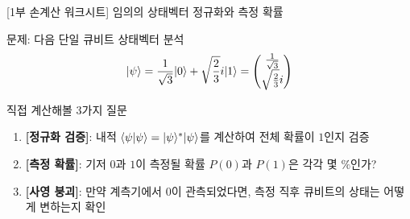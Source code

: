 \documentclass[aspectratio=169, 10pt]{beamer}
\begin{document}
\begin{frame}{[1부 손계산 워크시트] 임의의 상태벡터 정규화와 측정 확률}
    \begin{block}{문제: 다음 단일 큐비트 상태벡터 분석}
        $$|\psi\rangle = \frac{1}{\sqrt{3}}|0\rangle + \sqrt{\frac{2}{3}}i|1\rangle = \begin{pmatrix} \frac{1}{\sqrt{3}} \\ \sqrt{\frac{2}{3}}i \end{pmatrix}$$
    \end{block}\pause
    \vspace{0.2cm}
    \begin{exampleblock}{직접 계산해볼 3가지 질문}
        \begin{enumerate}
            \item \textbf{[정규화 검증]}: 내적 $\langle\psi|\psi\rangle = |\psi\rangle^* |\psi\rangle$를 계산하여 전체 확률이 $1$인지 검증
            \item \textbf{[측정 확률]}: 기저 $0$과 $1$이 측정될 확률 $P(0)$과 $P(1)$은 각각 몇 $\%$인가?
            \item \textbf{[사영 붕괴]}: 만약 계측기에서 $0$이 관측되었다면, 측정 직후 큐비트의 상태는 어떻게 변하는지 확인
        \end{enumerate}
    \end{exampleblock}
\end{frame}
\end{document}
